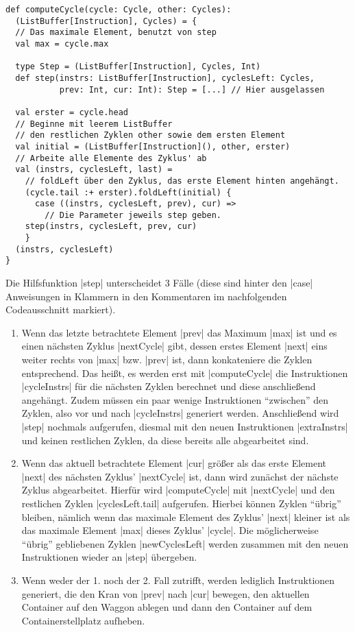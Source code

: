 \begin{lstlisting}
def computeCycle(cycle: Cycle, other: Cycles):
  (ListBuffer[Instruction], Cycles) = {
  // Das maximale Element, benutzt von step
  val max = cycle.max

  type Step = (ListBuffer[Instruction], Cycles, Int)
  def step(instrs: ListBuffer[Instruction], cyclesLeft: Cycles,
           prev: Int, cur: Int): Step = [...] // Hier ausgelassen

  val erster = cycle.head
  // Beginne mit leerem ListBuffer
  // den restlichen Zyklen other sowie dem ersten Element
  val initial = (ListBuffer[Instruction](), other, erster)
  // Arbeite alle Elemente des Zyklus' ab
  val (instrs, cyclesLeft, last) =
    // foldLeft über den Zyklus, das erste Element hinten angehängt.
    (cycle.tail :+ erster).foldLeft(initial) {
      case ((instrs, cyclesLeft, prev), cur) =>
        // Die Parameter jeweils step geben.
	step(instrs, cyclesLeft, prev, cur)
    }
  (instrs, cyclesLeft)
}
\end{lstlisting}
\lstset{basicstyle=\ttfamily}
Die Hilfsfunktion |step| unterscheidet 3 Fälle (diese sind hinter den |case| Anweisungen in Klammern in den Kommentaren im nachfolgenden Codeausschnitt markiert).
\begin{enumerate}
 \item Wenn das letzte betrachtete Element |prev| das Maximum |max| ist und es einen nächsten Zyklus |nextCycle| gibt,
       dessen erstes Element |next| eins weiter rechts von |max| bzw. |prev| ist, dann konkateniere die Zyklen entsprechend.
       Das heißt, es werden erst mit |computeCycle| die Instruktionen |cycleInstrs| für die nächsten Zyklen berechnet
       und diese anschließend angehängt. Zudem müssen ein paar wenige Instruktionen ``zwischen'' den Zyklen,
       also vor und nach |cycleInstrs| generiert werden. Anschließend wird |step| nochmals aufgerufen,
       diesmal mit den neuen Instruktionen |extraInstrs| und keinen restlichen Zyklen, da diese bereits alle abgearbeitet sind.
 \item Wenn das aktuell betrachtete Element |cur| größer als das erste Element |next| des nächsten Zyklus' |nextCycle| ist,
       dann wird zunächst der nächste Zyklus abgearbeitet.
       Hierfür wird |computeCycle| mit |nextCycle| und den restlichen Zyklen |cyclesLeft.tail| aufgerufen.
       Hierbei können Zyklen ``übrig'' bleiben,
       nämlich wenn das maximale Element des Zyklus' |next| kleiner ist als das maximale Element |max| dieses Zyklus' |cycle|.
       Die möglicherweise ``übrig'' gebliebenen Zyklen |newCyclesLeft| werden zusammen mit den neuen Instruktionen wieder an |step| übergeben.
 \item Wenn weder der 1. noch der 2. Fall zutrifft, werden lediglich Instruktionen generiert,
       die den Kran von |prev| nach |cur| bewegen, den aktuellen Container auf den Waggon ablegen und dann den Container auf dem Containerstellplatz aufheben.
\end{enumerate}
